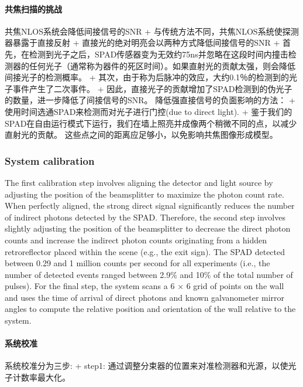\documentclass[11pt]{article}
\begin{document}
    \paragraph{共焦扫描的挑战}\label{ux5171ux7126ux626bux63cfux7684ux6311ux6218}

共焦NLOS系统会降低间接信号的SNR +
与传统方法不同，共焦NLOS系统使探测器暴露于直接反射 +
直接光的绝对明亮会以两种方式降低间接信号的SNR +
首先，在检测到光子之后，SPAD传感器变为无效约75ns并忽略在这段时间内撞击检测器的任何光子（通常称为器件的死区时间）。如果直射光的贡献太强，则会降低间接光子的检测概率。
+
其次，由于称为后脉冲的效应，大约0.1％的检测到的光子事件产生了二次事件。
+
因此，直接光子的贡献增加了SPAD检测到的伪光子的数量，进一步降低了间接信号的SNR。
降低强直接信号的负面影响的方法： +
使用时间选通SPAD来检测而对光子进行门控(due to direct light). +
鉴于我们的SPAD在自由运行模式下运行，我们在墙上照亮并成像两个稍微不同的点，以减少直射光的贡献。
这些点之间的距离应足够小，以免影响共焦图像形成模型。

    \subsubsection{System calibration}\label{system-calibration}

The first calibration step involves aligning the detector and light
source by adjusting the position of the beamsplitter to maximize the
photon count rate. When perfectly aligned, the strong direct signal
significantly reduces the number of indirect photons detected by the
SPAD. Therefore, the second step involves slightly adjusting the
position of the beamsplitter to decrease the direct photon counts and
increase the indirect photon counts originating from a hidden
retroreflector placed within the scene (e.g., the exit sign). The SPAD
detected between 0.29 and 1 million counts per second for all
experiments (i.e., the number of detected events ranged between 2.9\%
and 10\% of the total number of pulses). For the final step, the system
scans a 6 \(\times\) 6 grid of points on the wall and uses the time of
arrival of direct photons and known galvanometer mirror angles to
compute the relative position and orientation of the wall relative to
the system.

    \paragraph{系统校准}\label{ux7cfbux7edfux6821ux51c6}

系统校准分为三步: + step1:
通过调整分束器的位置来对准检测器和光源，以使光子计数率最大化。
\end{document}
